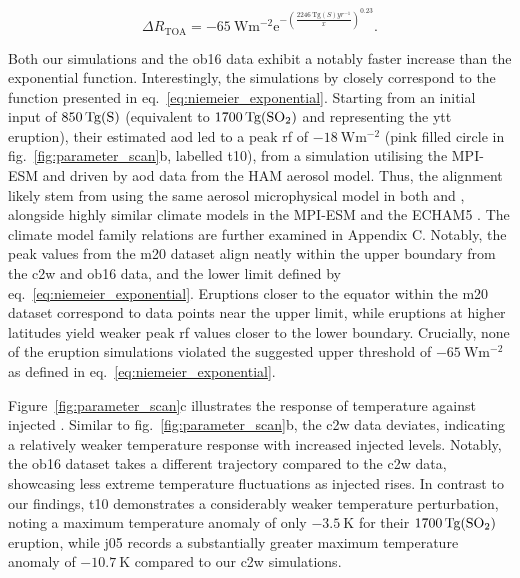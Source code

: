 \documentclass{ametsocV6.1}
\newcommand{\iso}[1][i]{{#1}njected \ce{SO2}}
\begin{document}
\begin{equation}
  \Delta
  R_{\mathrm{TOA}} =
  -\SI{65}{\watt\metre^{-2}}
  \mathrm{e}^{-{\left(\frac{\SI{2246}{\tera\gram(S)yr^{-1}}}{x}\right)}^{0.23}}.
  \label{eq:niemeier_exponential}
\end{equation}

Both our simulations and the \gls{ob16} data exhibit a notably faster increase than the
exponential function. Interestingly, the simulations by \citet{timmreck2010} closely
correspond to the function presented in eq.~\ref{eq:niemeier_exponential}. Starting from
an initial input of \(\SI{850}{\tera\gram(\ce{S})}\) (equivalent to
\(\SI{1700}{\tera\gram(\ce{SO2})}\) and representing the \gls{ytt} eruption), their
estimated \gls{aod} led to a peak \gls{rf} of \(\SI{-18}{\watt\metre^{-2}}\) (pink
filled circle in fig.~\ref{fig:parameter_scan}b, labelled \gls{t10}), from a simulation
utilising the MPI-ESM and driven by \gls{aod} data from the HAM aerosol model. Thus, the
alignment likely stem from using the same aerosol microphysical model in both
\citet{timmreck2010} and \citet{niemeier2015}, alongside highly similar climate models
in the MPI-ESM and the ECHAM5 \citep{kuma2023}. The climate model family relations are
further examined in Appendix C. Notably, the peak values from the \gls{m20} dataset
align neatly within the upper boundary from the \gls{c2w} and \gls{ob16} data, and the
lower limit defined by eq.~\ref{eq:niemeier_exponential}. Eruptions closer to the
equator within the \gls{m20} dataset correspond to data points near the upper limit,
while eruptions at higher latitudes yield weaker peak \gls{rf} values closer to the
lower boundary. Crucially, none of the eruption simulations violated the suggested upper
threshold of \(\SI{-65}{\watt\metre^{-2}}\) as defined in
eq.~\ref{eq:niemeier_exponential}.

Figure~\ref{fig:parameter_scan}c illustrates the response of temperature against \iso{}.
Similar to fig.~\ref{fig:parameter_scan}b, the \gls{c2w} data deviates, indicating a
relatively weaker temperature response with increased \iso{} levels. Notably, the
\gls{ob16} dataset takes a different trajectory compared to the \gls{c2w} data,
showcasing less extreme temperature fluctuations as \iso{} rises. In contrast to our
findings, \gls{t10} demonstrates a considerably weaker temperature perturbation, noting
a maximum temperature anomaly of only \(\SI{-3.5}{\kelvin}\) for their
\(\SI{1700}{\tera\gram(\ce{SO2})}\) eruption, while \gls{j05} records a substantially
greater maximum temperature anomaly of \(\SI{-10.7}{\kelvin}\) compared to our \gls{c2w}
simulations.
\end{document}
